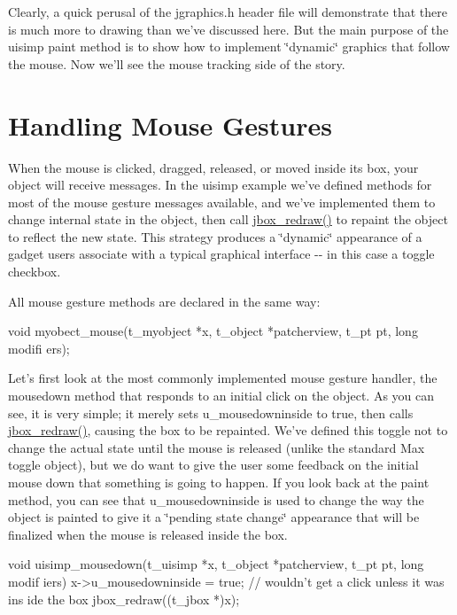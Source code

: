 Clearly, a quick perusal of the jgraphics.h header file will demonstrate that there is much more to drawing than we've discussed here. But the main purpose of the uisimp paint method is to show how to implement \char`\"{}dynamic\char`\"{} graphics that follow the mouse. Now we'll see the mouse tracking side of the story.\hypertarget{chapter_ui_anatomy_chapter_ui_anatomy_mouse}{}\section{Handling Mouse Gestures}\label{chapter_ui_anatomy_chapter_ui_anatomy_mouse}
When the mouse is clicked, dragged, released, or moved inside its box, your object will receive messages. In the uisimp example we've defined methods for most of the mouse gesture messages available, and we've implemented them to change internal state in the object, then call \hyperlink{group__jbox_ga92b553f8adc9994553590bbbcfd7e49d}{jbox\_\-redraw()} to repaint the object to reflect the new state. This strategy produces a \char`\"{}dynamic\char`\"{} appearance of a gadget users associate with a typical graphical interface -\/-\/ in this case a toggle checkbox.

All mouse gesture methods are declared in the same way:


\begin{DoxyCode}
    void myobect_mouse(t_myobject *x, t_object *patcherview, t_pt pt, long modifi
      ers);
\end{DoxyCode}


Let's first look at the most commonly implemented mouse gesture handler, the mousedown method that responds to an initial click on the object. As you can see, it is very simple; it merely sets u\_\-mousedowninside to true, then calls \hyperlink{group__jbox_ga92b553f8adc9994553590bbbcfd7e49d}{jbox\_\-redraw()}, causing the box to be repainted. We've defined this toggle not to change the actual state until the mouse is released (unlike the standard Max toggle object), but we do want to give the user some feedback on the initial mouse down that something is going to happen. If you look back at the paint method, you can see that u\_\-mousedowninside is used to change the way the object is painted to give it a \char`\"{}pending state change\char`\"{} appearance that will be finalized when the mouse is released inside the box.


\begin{DoxyCode}
    void uisimp_mousedown(t_uisimp *x, t_object *patcherview, t_pt pt, long modif
      iers)
    {
        x->u_mousedowninside = true;    // wouldn't get a click unless it was ins
      ide the box
        jbox_redraw((t_jbox *)x);
    }
\end{DoxyCode}


